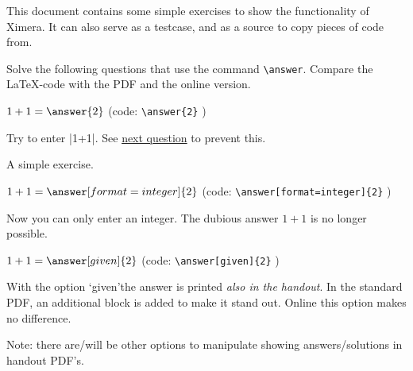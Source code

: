 \documentclass{ximera}
\begin{document}
    \author{Wim Obbels}
    \label{xim:simple_exercies}

This document contains some simple exercises to show the functionality of Ximera. It can also serve as a testcase, and as a source to copy pieces of code from.


\begin{exercise}    
    Solve the following questions that use the command \verb|\answer|. Compare the \LaTeX-code with the PDF and the online version.
	\begin{question}\label{itm:showCase:eerste_oefening}
        $1+1 = \answer{2}$ \hspace{2cm} (code:  \verb|\answer{2}| )

        \begin{hint} 
            Try to enter \vzerb|1+1|. See \hyperref[exc:answer_integer]{next question} to prevent this.
        \end{hint} 
        \begin{oplossing}
            A simple exercise. %
        \end{oplossing}
    \end{question}

    \begin{question}\label{itm:showCase:eerste_oefening}
        $1+1 = \answer[format=integer]{2}$ \hspace{2cm} (code:  \verb|\answer[format=integer]{2}| )
        \begin{oplossing}
            Now you can only enter an integer. The dubious answer $1+1$ is no longer possible.
        \end{oplossing}
    \end{question}

    \begin{question}
        $1+1 = \answer[given]{2}$ \hspace{2cm} (code:  \verb|\answer[given]{2}| )

        \begin{oplossing}
           With the option \lq given\rq the answer is printed  \textit{also in the handout}. 
            In the standard PDF, an additional block is added to make it stand out.
            Online this option makes no difference.

            Note: there are/will be other options to manipulate showing answers/solutions in handout PDF's.
        \end{oplossing}
    \end{question}


\end{exercise}
\end{document}
